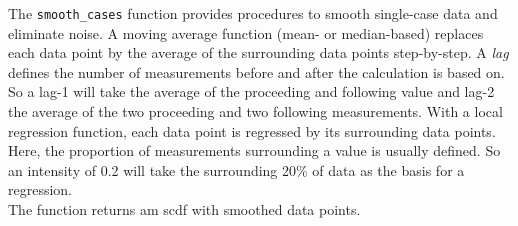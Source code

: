 \documentclass[
  letterpaper,
  DIV=11,
  numbers=noendperiod]{scrreprt}
\newenvironment{Shaded}{\begin{snugshade}}{\end{snugshade}}
\newcommand{\AttributeTok}[1]{\textcolor[rgb]{0.40,0.45,0.13}{#1}}
\newcommand{\DocumentationTok}[1]{\textcolor[rgb]{0.37,0.37,0.37}{\textit{#1}}}
\newcommand{\FunctionTok}[1]{\textcolor[rgb]{0.28,0.35,0.67}{#1}}
\newcommand{\NormalTok}[1]{\textcolor[rgb]{0.00,0.23,0.31}{#1}}
\newcommand{\OtherTok}[1]{\textcolor[rgb]{0.00,0.23,0.31}{#1}}
\newcommand{\SpecialCharTok}[1]{\textcolor[rgb]{0.37,0.37,0.37}{#1}}
\newcommand{\StringTok}[1]{\textcolor[rgb]{0.13,0.47,0.30}{#1}}
\begin{document}
The \texttt{smooth\_cases} function provides procedures to smooth
single-case data and eliminate noise. A moving average function (mean-
or median-based) replaces each data point by the average of the
surrounding data points step-by-step. A \emph{lag} defines the number of
measurements before and after the calculation is based on. So a lag-1
will take the average of the proceeding and following value and lag-2
the average of the two proceeding and two following measurements. With a
local regression function, each data point is regressed by its
surrounding data points. Here, the proportion of measurements
surrounding a value is usually defined. So an intensity of 0.2 will take
the surrounding 20\% of data as the basis for a regression.\\
The function returns am scdf with smoothed data points.

\begin{Shaded}
\end{Shaded}
\end{document}
